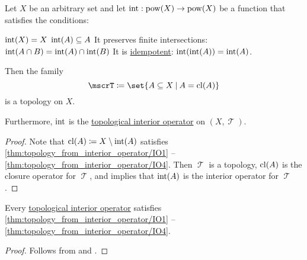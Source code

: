 \begin{proposition}\label{thm:topology_from_interior_operator}
  Let \( X \) be an arbitrary set and let \( \operatorname{int}: \operatorname{pow}(X) \to \operatorname{pow}(X) \) be a function that satisfies the conditions:
  \begin{thmenum}
     \( \operatorname{int}(X) = X \)
     \( \operatorname{int}(A) \subseteq A \)
     It preserves finite intersections: \( \operatorname{int}(A \cap B) = \operatorname{int}(A) \cap \operatorname{int}(B) \)
     It is \hyperref[def:binary_operation/idempotent]{idempotent}: \( \operatorname{int}(\operatorname{int}(A)) = \operatorname{int}(A) \).
  \end{thmenum}

  Then the family
  \begin{equation*}
    \mscrT \coloneqq \set{ A \subseteq X \given A = \cl(A) }
  \end{equation*}
  is a topology on \( X \).

  Furthermore, \( \operatorname{int} \) is the \hyperref[def:topological_interior_operator]{topological interior operator} on \( (X, \mscrT) \).
\end{proposition}
\begin{proof}
  Note that \( \operatorname{cl}(A) \coloneqq X \setminus \operatorname{int}(A) \) satisfies \ref{thm:topology_from_interior_operator/IO1} -- \ref{thm:topology_from_interior_operator/IO4}. Then \( \mscrT \) is a topology, \( \operatorname{cl}(A) \) is the closure operator for \( \mscrT \), and  implies that \( \operatorname{int}(A) \) is the interior operator for \( \mscrT \).
\end{proof}

\begin{proposition}\label{thm:topological_interior_operator_can_generate_topology}
  Every \hyperref[def:topological_interior_operator]{topological interior operator} satisfies \ref{thm:topology_from_interior_operator/IO1} -- \ref{thm:topology_from_interior_operator/IO4}.
\end{proposition}
\begin{proof}
  Follows from  and .
\end{proof}

